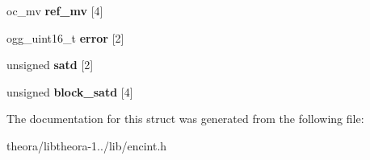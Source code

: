 \begin{DoxyCompactItemize}
\item 
\hypertarget{structoc__mb__enc__info_a9afb52a75ffe043668cddfd1a3015045}{oc\+\_\+mv {\bfseries ref\+\_\+mv} \mbox{[}4\mbox{]}}\label{structoc__mb__enc__info_a9afb52a75ffe043668cddfd1a3015045}

\item 
\hypertarget{structoc__mb__enc__info_ace6c887d0d5a96081ba6b91fac0c161d}{ogg\+\_\+uint16\+\_\+t {\bfseries error} \mbox{[}2\mbox{]}}\label{structoc__mb__enc__info_ace6c887d0d5a96081ba6b91fac0c161d}

\item 
\hypertarget{structoc__mb__enc__info_a035cc4fe6c2dc736502fc85a807230be}{unsigned {\bfseries satd} \mbox{[}2\mbox{]}}\label{structoc__mb__enc__info_a035cc4fe6c2dc736502fc85a807230be}

\item 
\hypertarget{structoc__mb__enc__info_abf430fd5b1e2899ca92e0d1826182714}{unsigned {\bfseries block\+\_\+satd} \mbox{[}4\mbox{]}}\label{structoc__mb__enc__info_abf430fd5b1e2899ca92e0d1826182714}

\end{DoxyCompactItemize}


The documentation for this struct was generated from the following file\+:\begin{DoxyCompactItemize}
\item 
theora/libtheora-\/1../lib/encint.\+h\end{DoxyCompactItemize}
